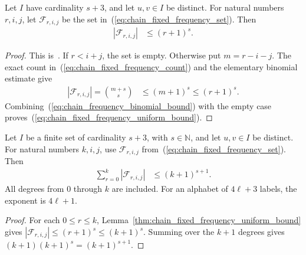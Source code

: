 \begin{lemma}
    \label{thm:chain_fixed_frequency_uniform_bound}
    \leanok
    Let $I$ have cardinality $s+3$, and let $u,v\in I$ be distinct.
    For natural numbers $r,i,j$, let $\mathcal F_{r,i,j}$ be the set
    in~(\ref{eq:chain_fixed_frequency_set}). Then
    \begin{align}
        |\mathcal F_{r,i,j}| & \le (r+1)^s.
        \label{eq:chain_fixed_frequency_uniform_bound}
    \end{align}
\end{lemma}
\begin{proof}\leanok
    This is~\cite[``Uniform bound for frequency slices'']{QICLean2026Blueprint}.
    If $r<i+j$, the set is empty. Otherwise put $m=r-i-j$.
    The exact count in~(\ref{eq:chain_fixed_frequency_count}) and the
    elementary binomial estimate give
    \begin{align}
        |\mathcal F_{r,i,j}|=\binom{m+s}{s}
         & \le (m+1)^s\le(r+1)^s.
        \label{eq:chain_frequency_binomial_bound}
    \end{align}
    Combining~(\ref{eq:chain_frequency_binomial_bound}) with the empty case
    proves~(\ref{eq:chain_fixed_frequency_uniform_bound}).
\end{proof}

\begin{lemma}
    \label{thm:chain_fixed_frequency_degree_sum}
    \leanok
    Let $I$ be a finite set of cardinality $s+3$, with $s\in\mathbb N$,
    and let $u,v\in I$ be distinct. For natural numbers $k,i,j$, use
    $\mathcal F_{r,i,j}$ from~(\ref{eq:chain_fixed_frequency_set}). Then
    \begin{align}
        \sum_{r=0}^{k}|\mathcal F_{r,i,j}|
         & \le (k+1)^{s+1}.
        \label{eq:chain_frequency_degree_sum}
    \end{align}
    All degrees from $0$ through $k$ are included. For an alphabet of
    $4\ell+3$ labels, the exponent is $4\ell+1$.
\end{lemma}
\begin{proof}\leanok
    For each $0\le r\le k$,
    Lemma~\ref{thm:chain_fixed_frequency_uniform_bound} gives
    $|\mathcal F_{r,i,j}|\le(r+1)^s\le(k+1)^s$.
    Summing over the $k+1$ degrees gives
    $(k+1)(k+1)^s=(k+1)^{s+1}$.
\end{proof}

